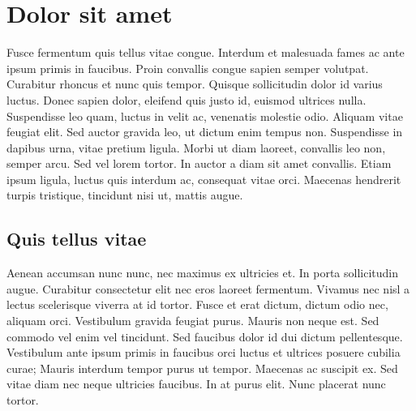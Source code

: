 \section{Dolor sit amet}

Fusce fermentum quis tellus vitae congue. Interdum et malesuada fames ac ante ipsum primis in faucibus. Proin convallis congue sapien semper volutpat. Curabitur rhoncus et nunc quis tempor. Quisque sollicitudin dolor id varius luctus. Donec sapien dolor, eleifend quis justo id, euismod ultrices nulla. Suspendisse leo quam, luctus in velit ac, venenatis molestie odio. Aliquam vitae feugiat elit. Sed auctor gravida leo, ut dictum enim tempus non. Suspendisse in dapibus urna, vitae pretium ligula. Morbi ut diam laoreet, convallis leo non, semper arcu. Sed vel lorem tortor. In auctor a diam sit amet convallis. Etiam ipsum ligula, luctus quis interdum ac, consequat vitae orci. Maecenas hendrerit turpis tristique, tincidunt nisi ut, mattis augue.

\subsection{Quis tellus vitae}

Aenean accumsan nunc nunc, nec maximus ex ultricies et. In porta sollicitudin augue. Curabitur consectetur elit nec eros laoreet fermentum. Vivamus nec nisl a lectus scelerisque viverra at id tortor. Fusce et erat dictum, dictum odio nec, aliquam orci. Vestibulum gravida feugiat purus. Mauris non neque est. Sed commodo vel enim vel tincidunt. Sed faucibus dolor id dui dictum pellentesque. Vestibulum ante ipsum primis in faucibus orci luctus et ultrices posuere cubilia curae; Mauris interdum tempor purus ut tempor. Maecenas ac suscipit ex. Sed vitae diam nec neque ultricies faucibus. In at purus elit. Nunc placerat nunc tortor.